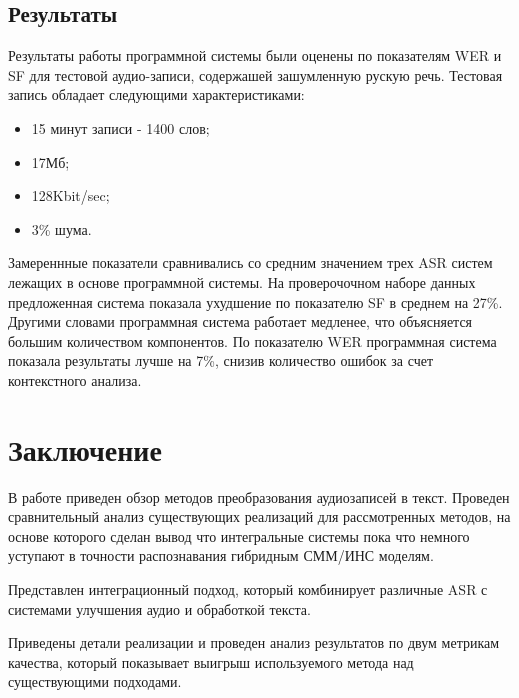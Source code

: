 \documentclass[conference]{IEEEtran}
\begin{document}
\subsection{Результаты}
Результаты работы программной системы были оценены по показателям WER и SF для тестовой аудио-записи, содержашей зашумленную рускую речь.
Тестовая запись обладает следующими характеристиками:

\begin{itemize}
\item 15 минут записи - 1400 слов;
\item 17Мб;
\item 128Kbit/sec;
\item 3\% шума.
\end{itemize}

Замереннные показатели сравнивались со средним значением трех ASR систем лежащих в основе программной системы.
На проверочочном наборе данных предложенная система показала ухудшение по показателю SF в среднем на 27\%.
Другими словами программная система работает медленее, что объясняется большим количеством компонентов.
По показателю WER программная система показала результаты лучше на 7\%, снизив количество ошибок за счет контекстного анализа.

\section{Заключение}
В работе приведен обзор методов преобразования аудиозаписей в текст. Проведен сравнительный анализ существующих реализаций для рассмотренных методов, на основе которого сделан вывод что интегральные системы пока что немного уступают в точности распознавания гибридным СММ/ИНС моделям.

Представлен интеграционный подход, который комбинирует различные ASR с системами улучшения аудио и обработкой текста.

Приведены детали реализации и проведен анализ результатов по двум метрикам качества, который показывает выигрыш используемого метода над существующими подходами.
\end{document}
